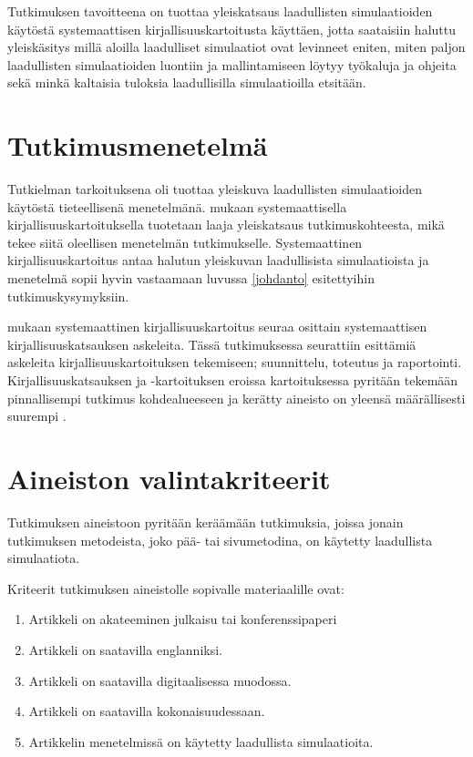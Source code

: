 \documentclass[utf8]{gradu3}
\begin{document}
Tutkimuksen tavoitteena on tuottaa yleiskatsaus laadullisten simulaatioiden käytöstä
systemaattisen kirjallisuuskartoitusta käyttäen, jotta saataisiin haluttu yleiskäsitys millä aloilla laadulliset simulaatiot ovat levinneet eniten, miten paljon laadullisten simulaatioiden luontiin ja mallintamiseen löytyy työkaluja ja ohjeita sekä minkä kaltaisia tuloksia laadullisilla simulaatioilla etsitään.

\section{Tutkimusmenetelmä} \label{tutkimusmenetelmä}
Tutkielman tarkoituksena oli tuottaa yleiskuva laadullisten simulaatioiden käytöstä
tieteellisenä menetelmänä.
\textcite{keele2007guidelines} mukaan systemaattisella kirjallisuuskartoituksella 
tuotetaan laaja yleiskatsaus tutkimuskohteesta,
mikä tekee siitä oleellisen menetelmän tutkimukselle. 
Systemaattinen kirjallisuuskartoitus antaa halutun yleiskuvan laadullisista simulaatioista ja menetelmä sopii hyvin vastaamaan luvussa \ref{johdanto} esitettyihin tutkimuskysymyksiin.

\textcite{keele2007guidelines} mukaan systemaattinen kirjallisuuskartoitus seuraa
osittain systemaattisen kirjallisuuskatsauksen askeleita.
Tässä tutkimuksessa seurattiin \textcite{keele2007guidelines} esittämiä askeleita kirjallisuuskartoituksen tekemiseen; suunnittelu, toteutus ja raportointi.
Kirjallisuuskatsauksen ja -kartoituksen eroissa kartoituksessa pyritään tekemään 
pinnallisempi tutkimus kohdealueeseen ja kerätty aineisto on 
yleensä määrällisesti suurempi \parencite{keele2007guidelines}.

\section{Aineiston valintakriteerit} \label{valintakriteerit}
Tutkimuksen aineistoon pyritään keräämään tutkimuksia, joissa jonain tutkimuksen metodeista, joko pää- tai sivumetodina, on käytetty laadullista simulaatiota.

Kriteerit tutkimuksen aineistolle sopivalle materiaalille ovat:
\begin{enumerate}
    \item Artikkeli on akateeminen julkaisu tai konferenssipaperi
    \item Artikkeli on saatavilla englanniksi.
    \item Artikkeli on saatavilla digitaalisessa muodossa.
    \item Artikkeli on saatavilla kokonaisuudessaan.
    \item Artikkelin menetelmissä on käytetty laadullista simulaatioita.
\end{enumerate}
\end{document}
